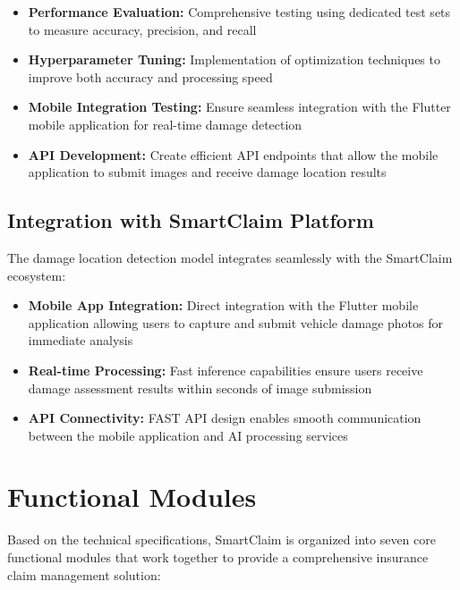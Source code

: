 \documentclass[12pt,a4paper]{report}
\begin{document}
\begin{itemize}
    \item \textbf{Performance Evaluation:} Comprehensive testing using dedicated test sets to measure accuracy, precision, and recall
    \item \textbf{Hyperparameter Tuning:} Implementation of optimization techniques to improve both accuracy and processing speed
    \item \textbf{Mobile Integration Testing:} Ensure seamless integration with the Flutter mobile application for real-time damage detection
    \item \textbf{API Development:} Create efficient API endpoints that allow the mobile application to submit images and receive damage location results
\end{itemize}

\subsection{Integration with SmartClaim Platform}

The damage location detection model integrates seamlessly with the SmartClaim ecosystem:

\begin{itemize}
    \item \textbf{Mobile App Integration:} Direct integration with the Flutter mobile application allowing users to capture and submit vehicle damage photos for immediate analysis
    \item \textbf{Real-time Processing:} Fast inference capabilities ensure users receive damage assessment results within seconds of image submission
    \item \textbf{API Connectivity:} FAST API design enables smooth communication between the mobile application and AI processing services
   
\end{itemize}

\section{Functional Modules}

Based on the technical specifications, SmartClaim is organized into seven core functional modules that work together to provide a comprehensive insurance claim management solution:
\end{document}
